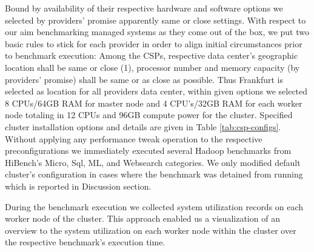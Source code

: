 \documentclass[review]{elsarticle}
\begin{document}
Bound by availability of their respective hardware and software options we selected by providers' promise apparently same or close settings. With respect to our aim benchmarking managed systems as they come out of the box, we put two basic rules to stick for each provider in order to align initial circumstances prior to benchmark execution: Among the CSPs, respective  data center's geographic location shall be same or close (1), processor number and memory capacity (by providers' promise) shall be same or as close as possible. Thus Frankfurt is selected as location for all providers data center, within given options we selected 8 CPUs/64GB RAM for master node and 4 CPU's/32GB RAM for each worker node totaling in 12 CPUs and 96GB compute power for the cluster. Specified cluster installation options and details are given in Table \ref{tab:csp-configs}. Without applying any performance tweak operation to the respective preconfigurations we immediately executed several Hadoop benchmarks from HiBench's Micro, Sql, ML, and Websearch categories. We only modified default cluster's configuration in cases where the benchmark was detained from running which is reported in Discussion section.

During the benchmark execution we collected system utilization records on each worker node of the cluster. This approach enabled us a visualization of an overview to the system utilization on each worker node within the cluster over the respective benchmark's execution time. 
\end{document}
